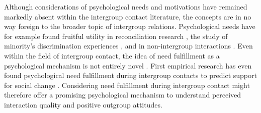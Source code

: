 \documentclass[man, 12pt, a4paper, mask]{apa7}
\theoremstyle{break}
\theoremstyle{plain}
\begin{document}


Although considerations of psychological needs and motivations have remained markedly absent within the intergroup contact literature, the concepts are in no way foreign to the broader topic of intergroup relations. Psychological needs have for example found fruitful utility in reconciliation research \citep[][]{Shnabel2008}, the study of minority's discrimination experiences \citep[][]{Celebi2017}, and in non-intergroup interactions \citep[][]{Downie2008}. 
Even within the field of intergroup contact, the idea of need fulfillment as a psychological mechanism is not entirely novel \citep[e.g.,][]{Dovidio2017}. First empirical research has even found psychological need fulfillment during intergroup contacts to predict support for social change \citep[][]{Hassler2021}. Considering need fulfillment during intergroup contact might therefore offer a promising psychological mechanism to understand perceived interaction quality and positive outgroup attitudes. 
\end{document}

